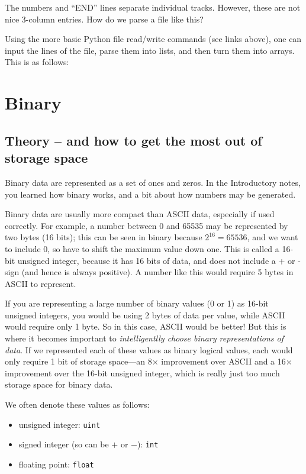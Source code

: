 \documentclass[a4paper,10pt]{scrartcl}
\begin{document}
The numbers and ``END'' lines separate individual tracks. However, these are not nice 3-column entries. How do we parse a file like this?

Using the more basic Python file read/write commands (see links above), one can input the lines of the file, parse them into lists, and then turn them into arrays. This is as follows:



\section{Binary}

\subsection{Theory -- and how to get the most out of storage space}

Binary data are represented as a set of ones and zeros. In the Introductory notes, you learned how binary works, and a bit about how numbers may be generated.

Binary data are usually more compact than ASCII data, especially if used correctly. For example, a number between 0 and 65535 may be represented by two bytes (16 bits); this can be seen in binary because $2^16 = 65536$, and we want to include 0, so have to shift the maximum value down one. This is called a 16-bit unsigned integer, because it has 16 bits of data, and does not include a + or - sign (and hence is always positive). A number like this would require 5 bytes in ASCII to represent.

If you are representing a large number of binary values (0 or 1) as 16-bit unsigned integers, you would be using 2 bytes of data per value, while ASCII would require only 1 byte. So in this case, ASCII would be better! But this is where it becomes important to \textit{intelligentlly choose binary representations of data}. If we represented each of these values as binary logical values, each would only require 1 bit of storage space---an 8$\times$ improvement over ASCII and a 16$\times$ improvement over the 16-bit unsigned integer, which is really just too much storage space for binary data.

We often denote these values as follows:
\begin{itemize}
 \item unsigned integer: \lstinline{uint}
 \item signed integer (so can be $+$ or $-$): \lstinline{int}
 \item floating point: \lstinline{float}
\end{itemize}
\end{document}
